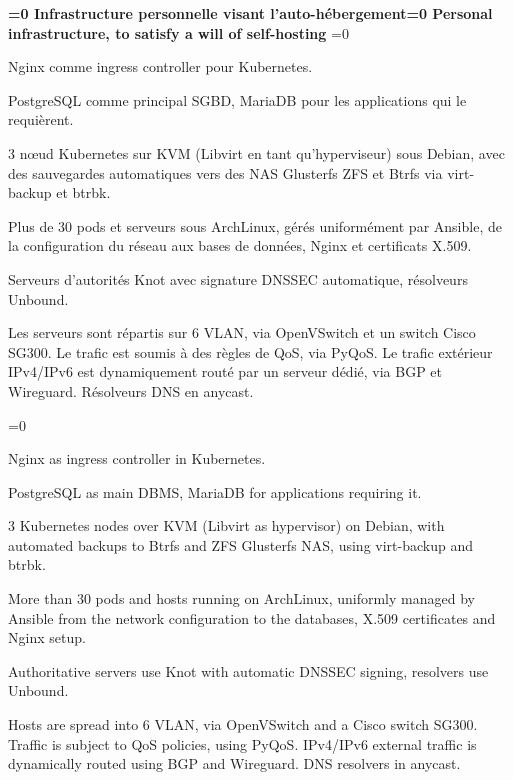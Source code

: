 \documentclass[11pt,a4paper,sans]{moderncv}
\newcommand{\babelFR}[1]{\ifnum\pdfstrcmp{\languagename}{french}=0 {#1}\fi}
\newcommand{\babelEN}[1]{\ifnum\pdfstrcmp{\languagename}{english}=0 {#1}\fi}
\begin{document}
{\textbf{\babelFR{Infrastructure personnelle visant l'auto-hébergement}\babelEN{Personal infrastructure, to satisfy a will of self-hosting}}%
\babelFR{
    \begin{description}[nolistsep]
        \item[Web:] Nginx comme ingress controller pour Kubernetes.
        \item[SGBD:] PostgreSQL comme principal SGBD, MariaDB pour
            les applications qui le requièrent.
        \item[Hyperviseur:] 3 nœud Kubernetes sur KVM (Libvirt en tant
            qu'hyperviseur) sous Debian, avec des sauvegardes automatiques vers
            des NAS Glusterfs ZFS et Btrfs via virt-backup et btrbk.
        \item [Orchestration:] Plus de 30 pods et serveurs sous ArchLinux, gérés
            uniformément par Ansible, de la configuration du réseau aux bases
            de données, Nginx et certificats X.509.
        \item[DNS:] Serveurs d'autorités Knot avec signature DNSSEC
            automatique, résolveurs Unbound.
        \item [Réseau:] Les serveurs sont répartis sur 6 VLAN, via OpenVSwitch
            et un switch Cisco SG300. Le trafic est soumis à des règles de QoS,
            via PyQoS. Le trafic extérieur IPv4/IPv6 est dynamiquement routé
            par un serveur dédié, via BGP et Wireguard. Résolveurs DNS en
            anycast.
    \end{description}
}%
\babelEN{%
    \begin{description}[nolistsep]
        \item[Web:] Nginx as ingress controller in Kubernetes.
        \item[Databases:] PostgreSQL as main DBMS, MariaDB for applications
            requiring it.
        \item[Hypervisor:] 3 Kubernetes nodes over KVM (Libvirt as hypervisor)
            on Debian, with automated backups to Btrfs and ZFS Glusterfs NAS,
            using virt-backup and btrbk.
        \item [Management:] More than 30 pods and hosts running on ArchLinux,
            uniformly managed by Ansible from the network configuration to the
            databases, X.509 certificates and Nginx setup.
        \item[DNS:] Authoritative servers use Knot with automatic DNSSEC
            signing, resolvers use Unbound.
        \item [Network:] Hosts are spread into 6 VLAN, via OpenVSwitch and a
            Cisco switch SG300. Traffic is subject to QoS policies, using
            PyQoS. IPv4/IPv6 external traffic is dynamically routed using BGP
            and Wireguard. DNS resolvers in anycast.
    \end{description}
}}
\vspace{-1em}
\end{document}
